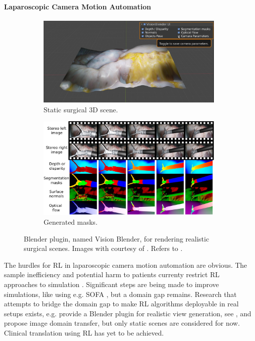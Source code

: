 \paragraph{Laparoscopic Camera Motion Automation}
\begin{figure}[tb]
    \centering
    \begin{subfigure}[b]{0.49\textwidth}
        \includegraphics[width=\textwidth]{introduction/img/vision_blender_view.jpg}
        \caption{Static surgical 3D scene.}
    \end{subfigure}
    \begin{subfigure}[b]{0.49\textwidth}
        \includegraphics[width=\textwidth]{introduction/img/vision_blender_masks.jpg}
        \caption{Generated masks.}
    \end{subfigure}
    \caption{Blender plugin, named Vision Blender, for rendering realistic surgical scenes. Images with courtesy of \cite{cartucho2021visionblender}. Refers to .}
    \label{in:fig:vision_blender}
\end{figure}
The hurdles for RL in laparoscopic camera motion automation are obvious. The sample inefficiency and potential harm to patients currenty restrict RL approaches to simulation \cite{su2021multicamera,agrawal2018automating}. Significant steps are being made to improve simulations, like \cite{scheikl2023lapgym} using e.g. SOFA \cite{allard2007sofa}, but a domain gap remains. Research that attempts to bridge the domain gap to make RL algorithms deployable in real setups exists, \cite{cartucho2021visionblender} e.g. provide a Blender plugin for realistic view generation, see , and \cite{marzullo2021towards} propose image domain transfer, but only static scenes are considered for now. Clinical translation using RL has yet to be achieved.

